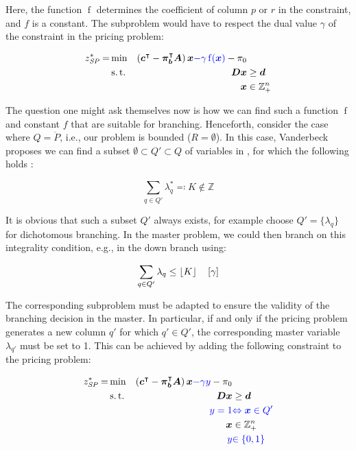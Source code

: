 Here, the function $\operatorname{f}$ determines the coefficient of column $p$ or $r$ in the constraint, and $f$ is a constant. The subproblem would have to respect the dual value $\gamma$ of the constraint in the pricing problem:

\begin{equation*}
\begin{aligned}
z^*_\SP{} = &\min & \left( \vec{c}\transpose - \vec{\pi}_\vec{b}\transpose \mat{A} \right) \vec{x} {\color{blue} - \gamma \operatorname{f}(\vec{x})} - \pi_0 & \\
&\st & \mat{D} \vec{x} & \geq \vec{d} \\
&& \vec{x} & \in \mathbb{Z}_+^n
\end{aligned}
\end{equation*}

The question one might ask themselves now is how we can find such a function $\operatorname{f}$ and constant $f$ that are suitable for branching. Henceforth, consider the case where $Q = \ddot{P}$, i.e., our problem is bounded ($R = \emptyset$). In this case, Vanderbeck proposes we can find a subset $\emptyset \subset Q' \subset Q$ of variables in \RMP{}, for which the following holds \cite{vanderbeck1996exact}:

\begin{equation}
\sum_{q \in Q'} \lambda_q^* \eqqcolon K \not\in \mathbb{Z}
\end{equation}

It is obvious that such a subset $Q'$ always exists, for example choose $Q' = \{\lambda_q\}$ for dichotomous branching. In the master problem, we could then branch on this integrality condition, e.g., in the down branch using:

\begin{equation}
\sum_{q \in Q'} \lambda_q \leq \lfloor K\rfloor \quad \left[\gamma\right]
\end{equation}

The corresponding subproblem must be adapted to ensure the validity of the branching decision in the master. In particular, if and only if the pricing problem generates a new column $q'$ for which $q' \in Q'$, the corresponding master variable $\lambda_{q'}$ must be set to 1. This can be achieved by adding the following constraint to the pricing problem:

\begin{equation}\label{eq:cg_bp_branchmaster_pricingmod}
\begin{aligned}
z^*_\SP{} = &\min & \left( \vec{c}\transpose - \vec{\pi}_\vec{b}\transpose \mat{A} \right) \vec{x} {\color{blue} - \gamma y} - \pi_0 & \\
&\st & \mat{D} \vec{x} & \geq \vec{d} \\
&& {\color{blue} y = 1} & {\color{blue} \Leftrightarrow \vec{x} \in Q'} \\
&& \vec{x} & \in \mathbb{Z}_+^n \\
&& {\color{blue} y} & {\color{blue} \in \{0, 1\}}
\end{aligned}
\end{equation}

